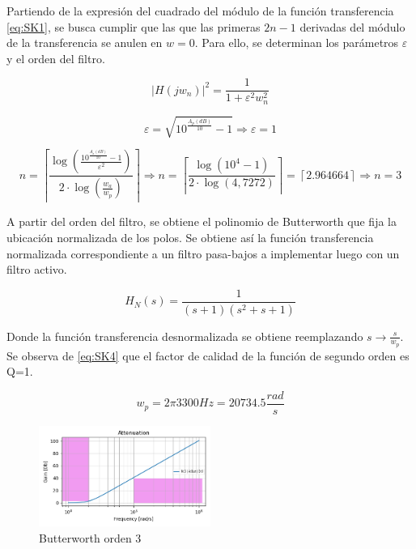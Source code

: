 Partiendo de la expresión del cuadrado del módulo de la función transferencia \ref{eq:SK1}, se busca cumplir que las que las primeras $2n - 1$ derivadas del módulo de la transferencia se anulen en $w=0$. Para ello, se determinan los parámetros $\varepsilon$ y el orden del filtro. 

\begin{equation}
        \left | H(jw_{n}) \right |^{2} = \frac{1}{1+\varepsilon ^{2}w_{n}^{2}}
    \label{eq:SK1}
\end{equation}

\begin{equation}
        \varepsilon = \sqrt{10^{\frac{A_{p}(dB)}{10}}-1} \Rightarrow \varepsilon = 1
    \label{eq:SK2}
\end{equation}

\begin{equation}
        n = \left \lceil  \frac{\log \left ( \frac{10^{\frac{A_{a}(dB)}{10}}-1}{\varepsilon ^{2}} \right )}{2\cdot \log \left (\frac{w_{a}}{w_{p}} \right )} \right \rceil \Rightarrow n = \left \lceil  \frac{\log \left ( 10^{4}-1 \right )}{2\cdot \log \left (4,7272 \right )} \right \rceil = \left \lceil 2.964664 \right \rceil \Rightarrow n = 3 
    \label{eq:SK3}
\end{equation}


A partir del orden del filtro, se obtiene el polinomio de Butterworth que fija la ubicación normalizada de los polos. Se obtiene así la función transferencia normalizada correspondiente a un filtro pasa-bajos a implementar luego con un filtro activo. 


\begin{equation}
        H_{N}(s) = \frac{1}{(s+1)(s^{2}+s+1)}
    \label{eq:SK4}
\end{equation}

Donde la función transferencia desnormalizada se obtiene reemplazando $s\rightarrow \frac{s}{w_{p}}$. Se observa de \ref{eq:SK4} que el factor de calidad de la función de segundo orden es Q=1.

$$w_{p} = 2 \pi 3300 Hz = 20734.5 \frac{rad}{s}$$

\begin{figure}[H]
    \centering
    \includegraphics[width= 0.5\textwidth]{../Ejercicio2-DisenoDeCeldas/1CeldaSallenKey/images/AtenuacionButter.png}
    \caption{Butterworth orden 3}
    \label{fig:butter3}
\end{figure}


